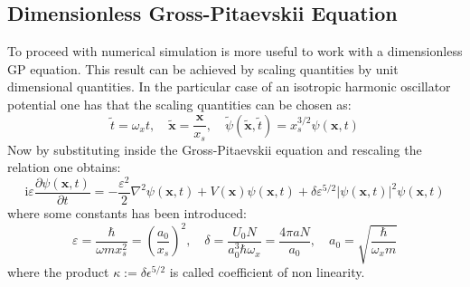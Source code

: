 \documentclass[a4paper,10pt]{article}
\begin{document}
\subsection{Dimensionless Gross-Pitaevskii Equation}
To proceed with numerical simulation is more useful to work with a dimensionless GP equation. This result can be achieved by scaling quantities by unit dimensional quantities. In the particular case of an isotropic harmonic oscillator potential one has that the scaling quantities can be chosen as:
\begin{equation}\label{eq:dimensionless-units}
	\tilde{t}=\omega_{x} t, \quad \tilde{\mathbf{x}}=\frac{\mathbf{x}}{x_{s}}, \quad \tilde{\psi}(\tilde{\mathbf{x}}, \tilde{t})=x_{s}^{3 / 2} \psi(\mathbf{x}, t)
\end{equation}
Now by substituting inside the Gross-Pitaevskii equation and rescaling the relation one obtains:
\[
	\mathrm{i} \varepsilon \frac{\partial \psi(\mathbf{x}, t)}{\partial t}=-\frac{\varepsilon^{2}}{2} \nabla^{2} \psi(\mathbf{x}, t)+V(\mathbf{x}) \psi(\mathbf{x}, t)+\delta \varepsilon^{5 / 2}|\psi(\mathbf{x}, t)|^{2} \psi(\mathbf{x}, t)
\]
where some constants has been introduced:
\begin{equation}\label{eq:adim-param}
	\varepsilon=\frac{\hbar}{\omega m x_{s}^{2}}=\left(\frac{a_{0}}{x_{s}}\right)^{2}, \quad \delta=\frac{U_{0} N}{a_{0}^{3} \hbar \omega_{x}}=\frac{4 \pi a N}{a_{0}}, \quad a_{0}=\sqrt{\frac{\hbar}{\omega_{x} m}}
\end{equation}
where the product $\kappa := \delta \epsilon^{5/2}$ is called coefficient of non linearity.
\end{document}
